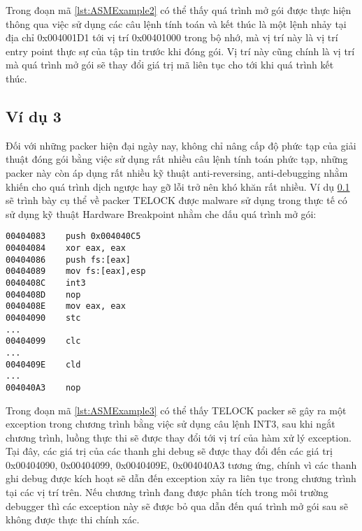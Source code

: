 \hspace{0.5cm}Trong đoạn mã \ref {lst:ASMExample2} có thể thấy quá trình mở gói được thực hiện thông qua việc sử dụng các câu lệnh tính toán và kết thúc là một lệnh nhảy tại địa chỉ 0x004001D1 tới vị trí 0x00401000 trong bộ nhớ, mà vị trí này là vị trí entry point thực sự của tập tin trước khi đóng gói. Vị trí này cũng chính là vị trí mà quá trình mở gói sẽ thay đổi giá trị mã liên tục cho tới khi quá trình kết thúc. 

\subsection{Ví dụ 3}\label{subsec:Example3}

\hspace{0.5cm}Đối với những packer hiện đại ngày nay, không chỉ nâng cấp độ phức tạp của giải thuật đóng gói bằng việc sử dụng rất nhiều câu lệnh tính toán phức tạp, những packer này còn áp dụng rất nhiều kỹ thuật anti-reversing, anti-debugging nhằm khiến cho quá trình dịch ngược hay gỡ lỗi trở nên khó khăn rất nhiều. Ví dụ \ref {subsec:Example3} sẽ trình bày cụ thể về packer TELOCK được malware sử dụng trong thực tế có sử dụng kỹ thuật Hardware Breakpoint nhằm che dấu quá trình mở gói:

\begin{code}
\begin{lstlisting}[captionpos=b,caption={Kỹ thuật Hardware Breakpoints sử dụng trong packer TELOCK},label={lst:ASMExample3},frame=single]
00404083	push 0x004040C5
00404084	xor eax, eax
00404086	push fs:[eax]
00404089	mov fs:[eax],esp
0040408C 	int3
0040408D 	nop
0040408E 	mov eax, eax 
00404090 	stc
...
00404099 	clc
...
0040409E 	cld
...
004040A3 	nop
\end{lstlisting}
\end{code}

\hspace{0.5cm}Trong đoạn mã \ref {lst:ASMExample3} có thể thấy TELOCK packer sẽ gây ra một exception trong chương trình bằng việc sử dụng câu lệnh INT3, sau khi ngắt chương trình, luồng thực thi sẽ được thay đổi tới vị trí của hàm xử lý exception. Tại đây, các giá trị của các thanh ghi debug sẽ được thay đổi đến các giá trị 0x00404090, 0x00404099, 0x0040409E, 0x004040A3 tương ứng, chính vì các thanh ghi debug được kích hoạt sẽ dẫn đến exception xảy ra liên tục trong chương trình tại các vị trí trên. Nếu chương trình đang được phân tích trong môi trường debugger thì các exception này sẽ được bỏ qua dẫn đến quá trình mở gói sau sẽ không được thực thi chính xác.   

